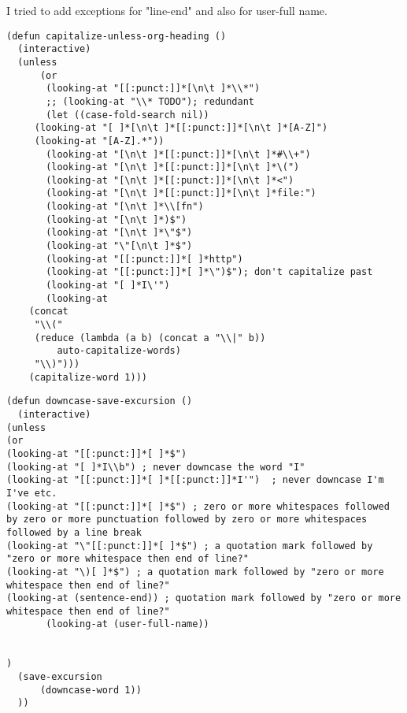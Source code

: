 \documentclass[11pt]{article}
\begin{document}
I tried to add exceptions for "line-end" and also for user-full name.

\label{sec:org541a1a3}
\begin{verbatim}
(defun capitalize-unless-org-heading ()
  (interactive)
  (unless
      (or
       (looking-at "[[:punct:]]*[\n\t ]*\\*")
       ;; (looking-at "\\* TODO"); redundant
       (let ((case-fold-search nil))
	 (looking-at "[ ]*[\n\t ]*[[:punct:]]*[\n\t ]*[A-Z]")
	 (looking-at "[A-Z].*"))
       (looking-at "[\n\t ]*[[:punct:]]*[\n\t ]*#\\+")
       (looking-at "[\n\t ]*[[:punct:]]*[\n\t ]*\(")
       (looking-at "[\n\t ]*[[:punct:]]*[\n\t ]*<")
       (looking-at "[\n\t ]*[[:punct:]]*[\n\t ]*file:")
       (looking-at "[\n\t ]*\\[fn")
       (looking-at "[\n\t ]*)$")
       (looking-at "[\n\t ]*\"$")
       (looking-at "\"[\n\t ]*$")
       (looking-at "[[:punct:]]*[ ]*http")
       (looking-at "[[:punct:]]*[ ]*\")$"); don't capitalize past
       (looking-at "[ ]*I\'")
       (looking-at
	(concat
	 "\\("
	 (reduce (lambda (a b) (concat a "\\|" b))
		 auto-capitalize-words)
	 "\\)")))
    (capitalize-word 1)))
\end{verbatim}

\label{sec:orgb960197}

\begin{verbatim}
(defun downcase-save-excursion ()
  (interactive)
(unless
(or
(looking-at "[[:punct:]]*[ ]*$") 
(looking-at "[ ]*I\\b") ; never downcase the word "I"
(looking-at "[[:punct:]]*[ ]*[[:punct:]]*I'")  ; never downcase I'm I've etc.
(looking-at "[[:punct:]]*[ ]*$") ; zero or more whitespaces followed by zero or more punctuation followed by zero or more whitespaces followed by a line break
(looking-at "\"[[:punct:]]*[ ]*$") ; a quotation mark followed by "zero or more whitespace then end of line?"
(looking-at "\)[ ]*$") ; a quotation mark followed by "zero or more whitespace then end of line?"
(looking-at (sentence-end)) ; quotation mark followed by "zero or more whitespace then end of line?"
       (looking-at (user-full-name))


)
  (save-excursion
      (downcase-word 1))
  ))
\end{verbatim}
\end{document}
